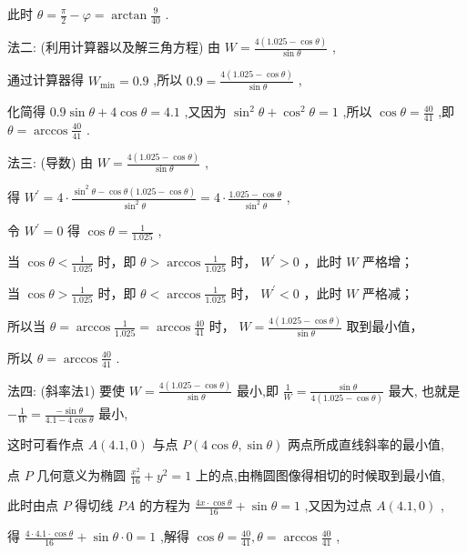 \documentclass[10pt]{article}
\begin{document}
此时 \(\theta  = \frac{\pi }{2} - \varphi  = \arctan \frac{9}{40}\) .

法二: (利用计算器以及解三角方程) 由 \(W = \frac{4\left( {{1.025} - \cos \theta }\right) }{\sin \theta }\) ,

通过计算器得 \({W}_{\min } = {0.9}\) ,所以 \({0.9} = \frac{4\left( {{1.025} - \cos \theta }\right) }{\sin \theta }\) ,

化简得 \({0.9}\sin \theta  + 4\cos \theta  = {4.1}\) ,又因为 \({\sin }^{2}\theta  + {\cos }^{2}\theta  = 1\) ,所以 \(\cos \theta  = \frac{40}{41}\) ,即 \(\theta  = \arccos \frac{40}{41}\) .

法三: (导数) 由 \(W = \frac{4\left( {{1.025} - \cos \theta }\right) }{\sin \theta }\) ,

得 \({W}^{\prime } = 4 \cdot  \frac{{\sin }^{2}\theta  - \cos \theta \left( {{1.025} - \cos \theta }\right) }{{\sin }^{2}\theta } = 4 \cdot  \frac{{1.025} - \cos \theta }{{\sin }^{2}\theta }\) ,

令 \({W}^{\prime } = 0\) 得 \(\cos \theta  = \frac{1}{1.025}\) ,

当 \(\cos \theta  < \frac{1}{1.025}\) 时，即 \(\theta  > \arccos \frac{1}{1.025}\) 时， \({W}^{\prime } > 0\) ，此时 \(W\) 严格增；

当 \(\cos \theta  > \frac{1}{1.025}\) 时，即 \(\theta  < \arccos \frac{1}{1.025}\) 时， \({W}^{\prime } < 0\) ，此时 \(W\) 严格减；

所以当 \(\theta  = \arccos \frac{1}{1.025} = \arccos \frac{40}{41}\) 时， \(W = \frac{4\left( {{1.025} - \cos \theta }\right) }{\sin \theta }\) 取到最小值，

所以 \(\theta  = \arccos \frac{40}{41}\) .

法四: (斜率法1) 要使 \(W = \frac{4\left( {{1.025} - \cos \theta }\right) }{\sin \theta }\) 最小,即 \(\frac{1}{W} = \frac{\sin \theta }{4\left( {{1.025} - \cos \theta }\right) }\) 最大, 也就是 \(- \frac{1}{W} = \frac{-\sin \theta }{{4.1} - 4\cos \theta }\) 最小,

这时可看作点 \(A\left( {{4.1},0}\right)\) 与点 \(P\left( {4\cos \theta ,\sin \theta }\right)\) 两点所成直线斜率的最小值,

点 \(P\) 几何意义为椭圆 \(\frac{{x}^{2}}{16} + {y}^{2} = 1\) 上的点,由椭圆图像得相切的时候取到最小值,

此时由点 \(P\) 得切线 \({PA}\) 的方程为 \(\frac{{4x} \cdot  \cos \theta }{16} + \sin \theta  = 1\) ,又因为过点 \(A\left( {{4.1},0}\right)\) ,

得 \(\frac{4 \cdot  {4.1} \cdot  \cos \theta }{16} + \sin \theta  \cdot  0 = 1\) ,解得 \(\cos \theta  = \frac{40}{41},\theta  = \arccos \frac{40}{41}\) ,
\end{document}
